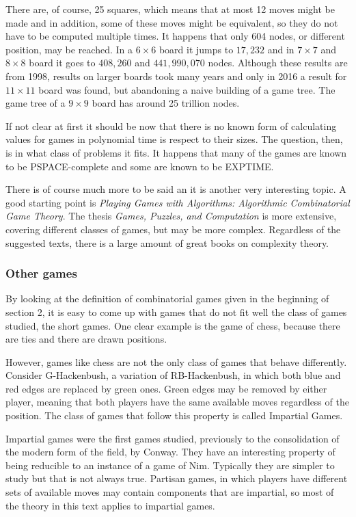 There are, of course, 25 squares, which means that at most 12 moves might be made and in addition, some of these moves might be equivalent, so they do not have to be computed multiple times. It happens that only 604 nodes, or different position, may be reached\cite{1}. In a $6\times 6$ board it jumps to $17,232$ and in $7\times 7$ and $8\times 8$ board it goes to $408,260$ and $441,990,070$ nodes. Although these results are from 1998, results on larger boards took many years and only in 2016 a result for $11 \times 11$\cite{2} board was found, but abandoning a naive building of a game tree. The game tree of a $9\times 9$ board has around 25 trillion nodes.

If not clear at first it should be now that there is no known form of calculating values for games in polynomial time is respect to their sizes. The question, then, is in what class of problems it fits. It happens that many of the games are known to be PSPACE-complete and some are known to be EXPTIME.

There is of course much more to be said an it is another very interesting topic. A good starting point is \textit{Playing Games with Algorithms: Algorithmic Combinatorial Game Theory}\cite{3}. The thesis \textit{Games, Puzzles, and Computation} is more extensive, covering different classes of games, but may be more complex. Regardless of the suggested texts, there is a large amount of great books on complexity theory.

\subsubsection*{Other games}

By looking at the definition of combinatorial games given in the beginning of section 2, it is easy to come up with games that do not fit well the class of games studied, the short games. One clear example is the game of chess, because there are ties and there are drawn positions.

However, games like chess are not the only class of games that behave differently. Consider G-Hackenbush, a variation of RB-Hackenbush, in which both blue and red edges are replaced by green ones. Green edges may be removed by either player, meaning that both players have the same available moves regardless of the position. The class of games that follow this property is called Impartial Games.

Impartial games were the first games studied, previously to the consolidation of the modern form of the field, by Conway. They have an interesting property of being reducible to an instance of a game of Nim. Typically they are simpler to study but that is not always true. Partisan games, in which players have different sets of available moves may contain components that are impartial, so most of the theory in this text applies to impartial games.

